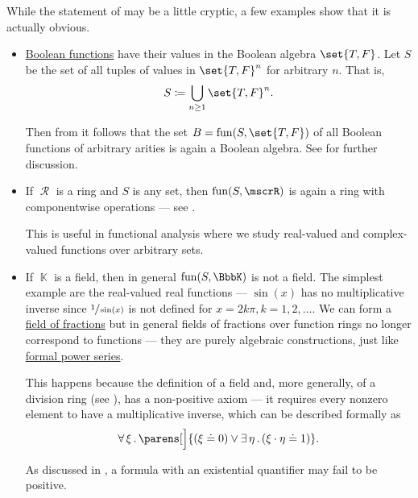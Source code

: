 \begin{example}\label{ex:thm:functions_over_model_of_positive_formulas_form_model}
  While the statement of  may be a little cryptic, a few examples show that it is actually obvious.
  \begin{itemize}
    \item \hyperref[def:boolean_function]{Boolean functions} have their values in the Boolean algebra \( \set{ T, F } \). Let \( S \) be the set of all tuples of values in \( \set{ T, F }^n \) for arbitrary \( n \). That is,
    \begin{equation*}
      S \coloneqq \bigcup_{n \geq 1} \set{ T, F }^n.
    \end{equation*}

    Then from  it follows that the set \( B = \fun(S, \set{ T, F }) \) of all Boolean functions of arbitrary arities is again a Boolean algebra. See  for further discussion.

    \item If \( \mscrR \) is a ring and \( S \) is any set, then \( \fun(S, \mscrR) \) is again a ring with componentwise operations --- see .

    This is useful in functional analysis where we study real-valued and complex-valued functions over arbitrary sets.

    \item If \( \BbbK \) is a field, then in general \( \fun(S, \BbbK) \) is not a field. The simplest example are the real-valued real functions --- \( \sin(x) \) has no multiplicative inverse since \( \sfrac 1 {\sin(x)} \) is not defined for \( x = 2k\pi, k = 1, 2, \ldots \). We can form a \hyperref[def:field_of_fractions]{field of fractions} but in general fields of fractions over function rings no longer correspond to functions --- they are purely algebraic constructions, just like \hyperref[def:formal_power_series]{formal power series}.

    This happens because the definition of a field and, more generally, of a division ring (see ), has a non-positive axiom --- it requires every nonzero element to have a multiplicative inverse, which can be described formally as
    \begin{equation*}
      \qforall \xi \parens[\Big]{ (\xi \doteq 0) \vee \qexists \eta (\xi \cdot \eta \doteq 1) }.
    \end{equation*}

    As discussed in , a formula with an existential quantifier may fail to be positive.
  \end{itemize}
\end{example}

